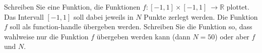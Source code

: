 \begin{aufg}[0]
Schreiben Sie eine Funktion, die Funktionen $f:[-1,1] \times [-1,1] \
\rightarrow \mathbb{R}$ plottet. Das Intervall $[-1,1]$ soll
dabei jeweils in $N$ Punkte zerlegt werden. Die Funktion $f$ soll als
function-handle \"ubergeben werden. Schreiben Sie die Funktion so, dass wahlweise
nur die Funktion $f$ \"ubergeben werden kann (dann $N=50$) oder aber $f$ und $N$.
\end{aufg}